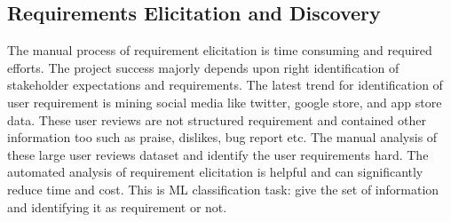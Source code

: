 \subsection{Requirements Elicitation and Discovery} The manual process of
requirement elicitation is time consuming and required efforts. The project
success majorly depends upon right identification of stakeholder expectations
and requirements. The latest trend for identification of user requirement is
mining social media like twitter, google store, and app store data. These user reviews are not structured requirement and contained other
information too such as praise, dislikes, bug report etc. The manual analysis of these large user
reviews dataset and identify the user requirements hard. The automated analysis
of requirement elicitation is helpful and can significantly reduce time and
cost. This is ML classification task: give the set of information and
identifying it as requirement or not.\\


